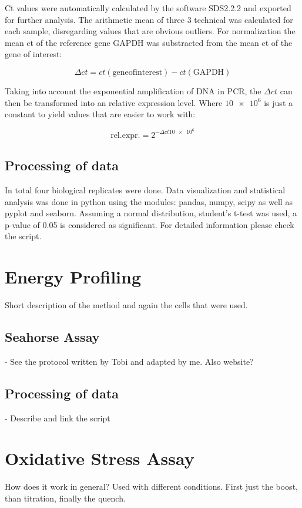     \noindent Ct values were automatically calculated by the software SDS2.2.2 and exported for further analysis. The arithmetic  mean of three 3 technical was calculated for each sample, disregarding values that are obvious outliers. For normalization the mean ct of the reference gene GAPDH was substracted from the mean ct of the gene of interest:

    $$\Delta ct = ct(\mathrm{gene of interest}) - ct(\mathrm{GAPDH})$$

    \noindent Taking into account the exponential amplification of DNA in PCR, the $\Delta ct$ can then be transformed into an relative expression level. Where $\num{10e6}$ is just a constant to yield values that are easier to work with:

    $$\mathrm{rel. expr.} = 2^{-\Delta ct\num{10e6}}$$

    \subsection{Processing of data}
    In total four biological replicates were done. Data visualization and statistical analysis was done in python using the modules: pandas, numpy, scipy as well as pyplot and seaborn. Assuming a normal distribution, student's t-test was used, a p-value of 0.05 is considered as significant. For detailed information please check the script.

\section{Energy Profiling}
\label{sec:seahorse}
Short description of the method and again the cells that were used.

    \subsection{Seahorse Assay}
    - See the protocol written by Tobi and adapted by me. Also website?

    \subsection{Processing of data}
    - Describe and link the script

\section{Oxidative Stress Assay}
\label{sec:cellrox}
How does it work in general?
Used with different conditions. First just the boost, than titration, finally the quench.

